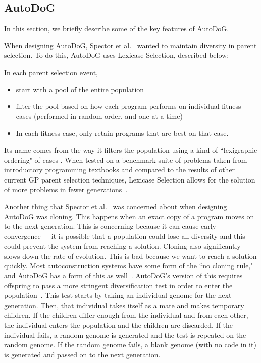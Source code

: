 \documentclass{sig-alternate}
\begin{document}
\subsection{AutoDoG}
\label{sec:autodog}
In this section, we briefly describe some of the key features of AutoDoG.

When designing AutoDoG, Spector et al.~\cite{spector:2016} wanted to maintain diversity in parent selection. To do this, AutoDoG uses Lexicase Selection, described below: 

In each parent selection event,
\begin{itemize}
	\item start with a pool of the entire population
	\item filter the pool based on how each program performs on individual fitness cases (performed in random order, and one at a time)
	\item In each fitness case, only retain programs that are best on that case.
\end{itemize}

Its name comes from the way it filters the population using a kind of ``lexigraphic ordering" of cases \cite{spector:2016}. When tested on a benchmark suite of problems taken from introductory programming textbooks and compared to the results of other current GP parent selection techniques, Lexicase Selection allows for the solution of more problems in fewer generations~\cite{spector:2016}.

Another thing that Spector et al.~\cite{spector:2016} was concerned about when designing AutoDoG was cloning. This happens when an exact copy of a program moves on to the next generation. This is concerning because it can cause early convergence~--~it is possible that a population could lose all diversity and this could prevent the system from reaching a solution.
Cloning also significantly slows down the rate of evolution. This is bad because we want to reach a solution quickly. Most autoconstruction systems have some form of the ``no cloning rule," and AutoDoG has a form of this as well~\cite{spector:2016}. AutoDoG's version of this requires offspring to pass a more stringent diversification test in order to enter the population~\cite{spector:2016}. This test starts by taking an individual genome for the next generation. Then, that individual takes itself as a mate and makes temporary children. If the children differ enough from the individual and from each other, the individual enters the population and the children are discarded. If the individual fails, a random genome is generated and the test is repeated on the random genome. If the random genome fails, a blank genome (with no code in it) is generated and passed on to the next generation.
\end{document}
